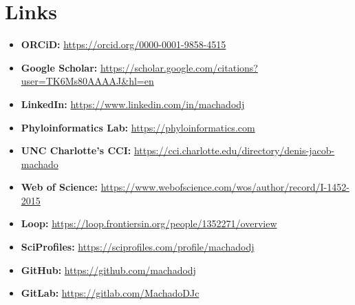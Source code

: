 \documentclass[11pt, letterpaper, sans]{moderncv}
\begin{document}

\section{Links}

    \begin{itemize}
        \item \textbf{ORCiD:} \url{https://orcid.org/0000-0001-9858-4515}
        \item \textbf{Google Scholar:} \url{https://scholar.google.com/citations?user=TK6Ms80AAAAJ&hl=en}
        \item \textbf{LinkedIn:} \url{https://www.linkedin.com/in/machadodj}
        \item \textbf{Phyloinformatics Lab:} \url{https://phyloinformatics.com}
        \item \textbf{UNC Charlotte's CCI:} \url{https://cci.charlotte.edu/directory/denis-jacob-machado}
        \item \textbf{Web of Science:} \url{https://www.webofscience.com/wos/author/record/I-1452-2015}
        \item \textbf{Loop:} \url{https://loop.frontiersin.org/people/1352271/overview}
        \item \textbf{SciProfiles:} \url{https://sciprofiles.com/profile/machadodj}
        \item \textbf{GitHub:} \url{https://github.com/machadodj}
        \item \textbf{GitLab:} \url{https://gitlab.com/MachadoDJc}
    \end{itemize}
\end{document}
